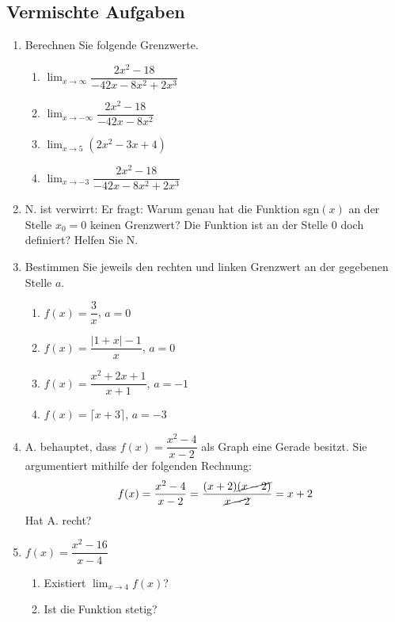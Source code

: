 \subsection{Vermischte Aufgaben}
\begin{enumerate}
    \item Berechnen Sie folgende Grenzwerte.
          \begin{enumerate}
              \item $\displaystyle\lim_{x\to \infty}\dfrac{2x^2-18}{-42 x - 8 x^2 + 2 x^3}$
              \item $\displaystyle\lim_{x\to -\infty}\dfrac{2x^2-18}{-42 x - 8 x^2}$
              \item $\displaystyle\lim_{x\to 5}\left(2x^2-3x+4\right)$
              \item $\displaystyle\lim_{x\to -3}\dfrac{2x^2-18}{-42 x - 8 x^2 + 2 x^3}$
          \end{enumerate}
    \item N. ist verwirrt: Er fragt: \glqq Warum genau hat die Funktion sgn$(x)$ an der Stelle $x_0=0$ keinen Grenzwert? Die Funktion ist an der Stelle $0$ doch definiert?\grqq{} Helfen Sie N.
    \item Bestimmen Sie jeweils den rechten und linken Grenzwert an der gegebenen Stelle $a$.
          \begin{enumerate}
              \item $f(x)=\dfrac{3}{x}$, $a=0$
              \item $f(x)=\dfrac{|1+x|-1}{x}$, $a=0$
              \item $f(x)=\dfrac{x^2+2x+1}{x+1}$, $a=-1$
              \item $f(x) = \lceil x+3\rceil$, $a=-3$
          \end{enumerate}
    \item A. behauptet, dass $f(x)=\dfrac{x^2-4}{x-2}$ als Graph eine Gerade besitzt. Sie argumentiert mithilfe der folgenden Rechnung:
          \[f(x)=\frac{x^2-4}{x-2}=\frac{(x+2)\cancel{(x-2)}}{\cancel{x-2}}=x+2\]
          Hat A. recht?
    \item $f(x)=\dfrac{x^2-16}{x-4}$
          \begin{enumerate}
              \item Existiert $\displaystyle \lim_{x\to 4}f(x)$?
              \item Ist die Funktion stetig?
          \end{enumerate}

\end{enumerate}
